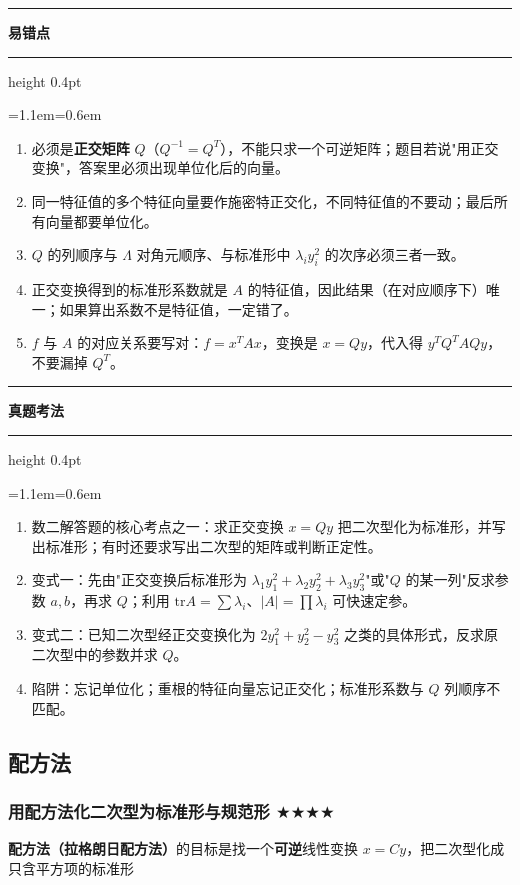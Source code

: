 \documentclass[11pt,openany,UTF8]{ctexbook}
\newcommand{\callouthead}[2]{%
  \par\addvspace{7pt}\noindent
  {\color{#1}\rule[-0.15em]{3pt}{1.05em}}\hspace{0.5em}%
  {\bfseries\color{#1}#2}\par\nobreak\vspace{-0.35em}%
  {\color{rulesep}\hrule height 0.4pt}\nobreak\vspace{0.45em}%
  \begingroup\small\setlength{\parindent}{0pt}%
  \leftskip=1.1em\rightskip=0.6em\noindent\ignorespaces}
\newcommand{\calloutend}{\par\endgroup\addvspace{7pt}}
\newenvironment{callwarn}[1]{\callouthead{warnbar}{#1}}{\calloutend}
\newenvironment{callexam}[1]{\callouthead{exambar}{#1}}{\calloutend}
\begin{document}
\begin{callwarn}{易错点}
\begin{enumerate}
\item 必须是\textbf{正交矩阵} $Q$（$Q^{-1}=Q^T$），不能只求一个可逆矩阵；题目若说"用正交变换"，答案里必须出现单位化后的向量。
\item 同一特征值的多个特征向量要作施密特正交化，不同特征值的不要动；最后所有向量都要单位化。
\item $Q$ 的列顺序与 $\Lambda$ 对角元顺序、与标准形中 $\lambda_i y_i^2$ 的次序必须三者一致。
\item 正交变换得到的标准形系数就是 $A$ 的特征值，因此结果（在对应顺序下）唯一；如果算出系数不是特征值，一定错了。
\item $f$ 与 $A$ 的对应关系要写对：$f=x^TAx$，变换是 $x=Qy$，代入得 $y^TQ^TAQy$，不要漏掉 $Q^T$。
\end{enumerate}
\end{callwarn}

\begin{callexam}{真题考法}
\begin{enumerate}
\item 数二解答题的核心考点之一：求正交变换 $x=Qy$ 把二次型化为标准形，并写出标准形；有时还要求写出二次型的矩阵或判断正定性。
\item 变式一：先由"正交变换后标准形为 $\lambda_1y_1^2+\lambda_2y_2^2+\lambda_3y_3^2$"或"$Q$ 的某一列"反求参数 $a,b$，再求 $Q$；利用 $\mathrm{tr}A=\sum\lambda_i$、$\vert A\vert=\prod\lambda_i$ 可快速定参。
\item 变式二：已知二次型经正交变换化为 $2y_1^2+y_2^2-y_3^2$ 之类的具体形式，反求原二次型中的参数并求 $Q$。
\item 陷阱：忘记单位化；重根的特征向量忘记正交化；标准形系数与 $Q$ 列顺序不匹配。
\end{enumerate}
\end{callexam}

\subsection{配方法}

\subsubsection{用配方法化二次型为标准形与规范形 $\bigstar$$\bigstar$$\bigstar$$\bigstar$}

\textbf{配方法（拉格朗日配方法）}的目标是找一个\textbf{可逆}线性变换 $x=Cy$，把二次型化成只含平方项的标准形
\end{document}
